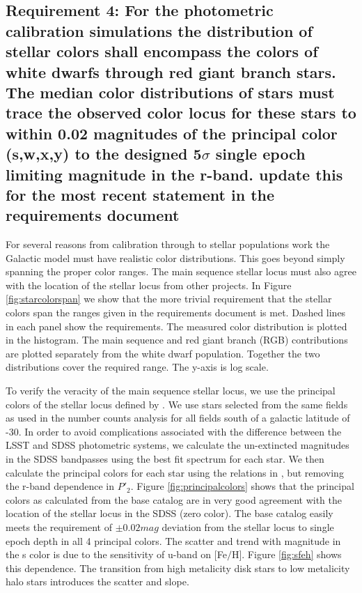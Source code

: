 \documentclass[]{article}
\begin{document}
\subsection{Requirement 4: For the photometric calibration simulations
the distribution of stellar colors shall encompass the colors of white dwarfs through red giant branch stars.
The median color distributions of stars must trace the observed color locus for these stars to within 0.02 magnitudes
of the principal color (s,w,x,y) to the designed 5$\sigma$ single epoch limiting magnitude in the r-band.
{\bf update this for the most recent statement in the requirements document}}
For several reasons from calibration through to stellar populations work the Galactic model must have realistic color distributions.
This goes beyond simply spanning the proper color ranges.  The main sequence stellar locus must also agree with the location of the
stellar locus from other projects.  In Figure \ref{fig:starcolorspan} we show that the more trivial requirement that the stellar
colors span the ranges given in the requirements document is met.  Dashed lines in each panel show the requirements.  The measured
color distribution is plotted in the histogram.  The main sequence and red giant branch (RGB) contributions are plotted separately from
the white dwarf population.  Together the two distributions cover the required range.  The y-axis is log scale.

To verify the veracity of the main sequence stellar locus, we use the principal colors of the stellar locus defined by \cite{ivezic04}.
We use stars selected from the same fields as used in the number counts analysis for all fields south of a galactic latitude of -30.
In order to avoid complications associated with the difference between the LSST and SDSS photometric systems, we calculate the un-extincted 
magnitudes in the SDSS bandpasses using the best fit spectrum for each star.  We then calculate
the principal colors for each star using the relations in \cite{ivezic04}, but removing the r-band dependence in $P\prime_{2}$.  Figure
\ref{fig:principalcolors} shows that the principal colors as calculated from the base catalog are in very good agreement with
the location of the stellar locus in the SDSS (zero color).  The base catalog easily meets the requirement of $\pm0.02mag$ deviation
from the stellar locus to single epoch depth in all 4 principal colors.  The scatter and trend with magnitude in the s color is due to 
the sensitivity of u-band on $[$Fe$/$H$]$.  Figure \ref{fig:sfeh} shows this dependence.  The transition from high metalicity disk stars to low 
metalicity halo stars introduces the scatter and slope.
\end{document}
